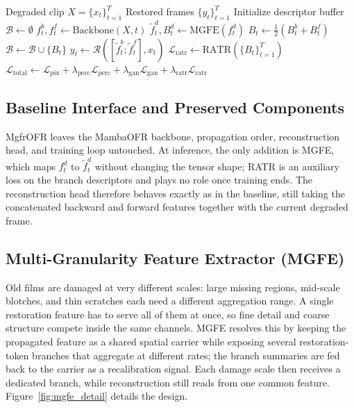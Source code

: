 \begin{algorithm}[H]
\caption{MgfrOFR forward pass for a clip of length $T$.\label{alg:mgfrofr}}
\begin{algorithmic}[1]
\Require Degraded clip $X=\{x_t\}_{t=1}^{T}$
\Ensure Restored frames $\{y_t\}_{t=1}^{T}$
\State Initialize descriptor buffer $\mathcal{B} \leftarrow \emptyset$
    \State $f_t^{b}, f_t^{f} \leftarrow \text{Backbone}(X, t)$ 
        \State $\widetilde{f}_t^{d}, B_t^{d} \leftarrow \text{MGFE}(f_t^{d})$ 
    \EndFor
    \State $B_t \leftarrow \frac{1}{2}(B_t^{b} + B_t^{f})$ 
    \State $\mathcal{B} \leftarrow \mathcal{B} \cup \{B_t\}$ 
    \State $y_t \leftarrow \mathcal{R}([\widetilde{f}_t^{b}; \widetilde{f}_t^{f}], x_t)$ 
\EndFor
{}
    \State $\mathcal{L}_{\text{ratr}} \leftarrow \text{RATR}(\{B_t\}_{t=1}^{T})$ 
    \State $\mathcal{L}_{\text{total}} \leftarrow \mathcal{L}_{\text{pix}} + \lambda_{\text{perc}}\mathcal{L}_{\text{perc}} + \lambda_{\text{gan}}\mathcal{L}_{\text{gan}} + \lambda_{\text{ratr}}\mathcal{L}_{\text{ratr}}$
\EndIf
\end{algorithmic}
\end{algorithm}

\subsection{Baseline Interface and Preserved Components}
\label{subsec:baseline_interface}

MgfrOFR leaves the MambaOFR backbone, propagation order, reconstruction head, and training loop untouched. At inference, the only addition is MGFE, which maps $f_t^{d}$ to $\widetilde{f}_t^{d}$ without changing the tensor shape; RATR is an auxiliary loss on the branch descriptors and plays no role once training ends. The reconstruction head therefore behaves exactly as in the baseline, still taking the concatenated backward and forward features together with the current degraded frame.

\subsection{Multi-Granularity Feature Extractor (MGFE)}
\label{subsec:mgfe}

Old films are damaged at very different scales: large missing regions, mid-scale blotches, and thin scratches each need a different aggregation range. A single restoration feature has to serve all of them at once, so fine detail and coarse structure compete inside the same channels. MGFE resolves this by keeping the propagated feature as a shared spatial carrier while exposing several restoration-token branches that aggregate at different rates; the branch summaries are fed back to the carrier as a recalibration signal. Each damage scale then receives a dedicated branch, while reconstruction still reads from one common feature. Figure~\ref{fig:mgfe_detail} details the design.

